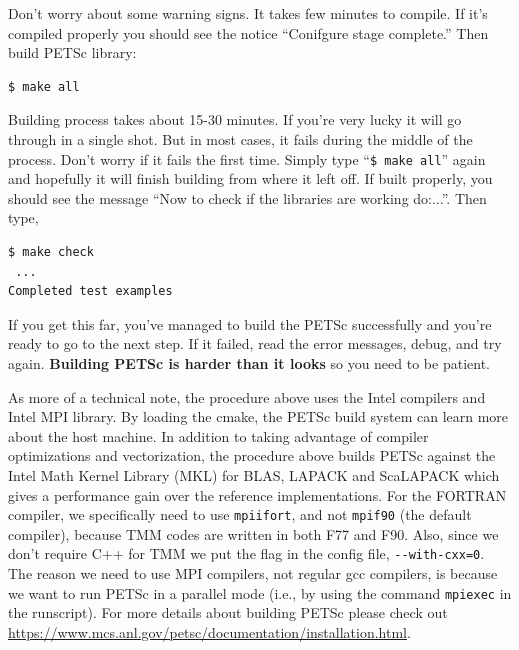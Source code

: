 \documentclass[a4paper]{article}
\def\noin{\noindent }
\begin{document}
\noin Don't worry about some warning signs. It takes few minutes to compile. If it's compiled properly you should see the notice ``Conifgure stage complete.'' Then build PETSc library:
\begin{lstlisting}[style=DOS]
 $ make all
\end{lstlisting}
Building process takes about 15-30 minutes. If you're very lucky it will go through in a single shot. But in most cases, it fails during the middle of the process. Don't worry if it fails the first time. Simply type ``\verb/$ make all/'' again and hopefully it will finish building from where it left off. If built properly, you should see the message ``Now to check if the libraries are working do:...''. Then type,
\begin{lstlisting}[style=DOS]
 $ make check
 ...
Completed test examples
\end{lstlisting}
If you get this far, you've managed to build the PETSc successfully and you're ready to go to the next step. If it failed, read the error messages, debug, and try again. \textbf{Building PETSc is harder than it looks} so you need to be patient. 

As more of a technical note, the procedure above uses the Intel compilers and Intel MPI library. By loading the cmake, the PETSc build system can learn more about the host machine. In addition to taking advantage of compiler optimizations and vectorization, the procedure above builds PETSc against the Intel Math Kernel Library (MKL) for BLAS, LAPACK and ScaLAPACK which gives a performance gain over the reference implementations. For the FORTRAN compiler, we specifically need to use \verb/mpiifort/, and not \verb/mpif90/ (the default compiler), because TMM codes are written in both F77 and F90. Also, since we don't require C++ for TMM we put the flag in the config file, \verb/--with-cxx=0/. The reason we need to use MPI compilers, not regular gcc compilers, is because we want to run PETSc in a parallel mode (i.e., by using the command \verb/mpiexec/ in the runscript). For more details about building PETSc please check out \url{https://www.mcs.anl.gov/petsc/documentation/installation.html}. 
\end{document}
